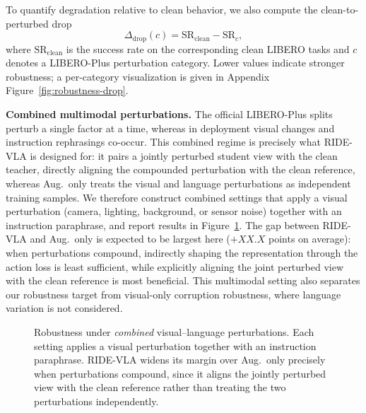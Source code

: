 \documentclass[letterpaper]{article} %
\newcommand{\method}{\textsc{RIDE-VLA}}
\newcommand{\gainComb}{XX.X}   %
\begin{document}
To quantify degradation relative to clean behavior, we also compute the clean-to-perturbed drop
\begin{equation}
    \Delta_{\mathrm{drop}}(c)
    =
    \mathrm{SR}_{\mathrm{clean}}
    -
    \mathrm{SR}_{c},
\end{equation}
where $\mathrm{SR}_{\mathrm{clean}}$ is the success rate on the corresponding clean LIBERO tasks and $c$ denotes a LIBERO-Plus perturbation category. Lower values indicate stronger robustness; a per-category visualization is given in Appendix Figure~\ref{fig:robustness-drop}.

\textbf{Combined multimodal perturbations.}
The official LIBERO-Plus splits perturb a single factor at a time, whereas in deployment visual changes and instruction rephrasings co-occur. This combined regime is precisely what \method{} is designed for: it pairs a jointly perturbed student view with the clean teacher, directly aligning the compounded perturbation with the clean reference, whereas Aug.\ only treats the visual and language perturbations as independent training samples. We therefore construct combined settings that apply a visual perturbation (camera, lighting, background, or sensor noise) together with an instruction paraphrase, and report results in Figure~\ref{fig:combined}. The gap between \method{} and Aug.\ only is expected to be largest here ($+\gainComb$ points on average): when perturbations compound, indirectly shaping the representation through the action loss is least sufficient, while explicitly aligning the joint perturbed view with the clean reference is most beneficial. This multimodal setting also separates our robustness target from visual-only corruption robustness, where language variation is not considered.

\begin{figure}[t]
\centering
\caption{Robustness under \emph{combined} visual--language perturbations. Each setting applies a visual perturbation together with an instruction paraphrase. \method{} widens its margin over Aug.\ only precisely when perturbations compound, since it aligns the jointly perturbed view with the clean reference rather than treating the two perturbations independently.}
\label{fig:combined}
\end{figure}
\end{document}
